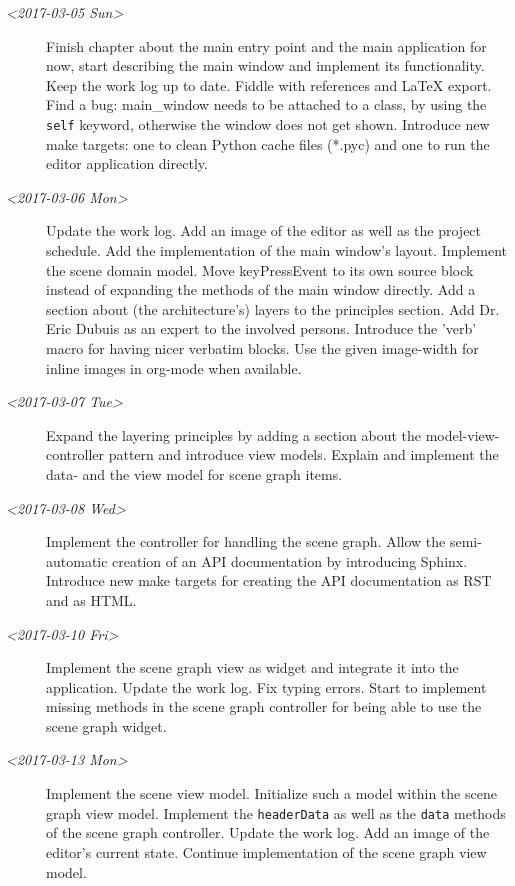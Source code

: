 \documentclass[10pt, openright, notitlepage]{scrreprt}
\begin{document}
\begin{description}
\item[{\textit{<2017-03-05 Sun>}}] Finish chapter about the main entry point and the main
application for now, start describing the main window and implement its
functionality. Keep the work log up to date. Fiddle with references and
\LaTeX{} export. Find a bug: main\_window needs to be attached to a class, by
using the \texttt{self} keyword, otherwise the window does not get shown.
Introduce new make targets: one to clean Python cache files (*.pyc) and one
to run the editor application directly.

\item[{\textit{<2017-03-06 Mon>}}] Update the work log. Add an image of the editor as well as
the project schedule. Add the implementation of the main window's layout.
Implement the scene domain model. Move keyPressEvent to its own source
block instead of expanding the methods of the main window directly. Add a
section about (the architecture's) layers to the principles section. Add
Dr. Eric Dubuis as an expert to the involved persons. Introduce the 'verb'
macro for having nicer verbatim blocks. Use the given image-width for
inline images in org-mode when available.

\item[{\textit{<2017-03-07 Tue>}}] Expand the layering principles by adding a section about
the model-view-controller pattern and introduce view models. Explain and
implement the data- and the view model for scene graph items.

\item[{\textit{<2017-03-08 Wed>}}] Implement the controller for handling the scene graph.
Allow the semi-automatic creation of an API documentation by introducing
Sphinx. Introduce new make targets for creating the API documentation as
RST and as HTML.

\item[{\textit{<2017-03-10 Fri>}}] Implement the scene graph view as widget and integrate it
into the application. Update the work log. Fix typing errors. Start to
implement missing methods in the scene graph controller for being able to
use the scene graph widget.

\item[{\textit{<2017-03-13 Mon>}}] Implement the scene view model. Initialize such a model
within the scene graph view model. Implement the \texttt{headerData} as well as
the \texttt{data} methods of the scene graph controller. Update the work log. Add
an image of the editor's current state. Continue implementation of the
scene graph view model.


\end{description}
\end{document}
